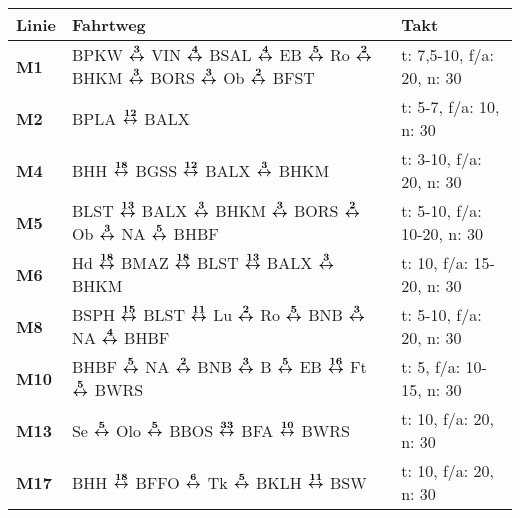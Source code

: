 \begin{minipage}[t]{0.05\textwidth}
\phantom{Tor}
\end{minipage}
\begin{minipage}[t]{0.45\textwidth}
\begin{tabular}{>{\bfseries}L{1.2cm}L{9.0cm}L{3.0cm}}
{\bfseries Linie} & {\bfseries Fahrtweg} & {\bfseries Takt} \\
\hline
\mtram{} M1   & BPKW $\xarwe{3}$ VIN $\xarwe{4}$ BSAL $\xarwe{4}$ EB $\xarwe{5}$ Ro $\xarwe{2}$ BHKM $\xarwe{3}$ BORS $\xarwe{3}$ Ob $\xarwe{2}$ BFST                               & t: 7,5-10, f/a: 20, n: 30  \\
\mtram{} M2   & BPLA $\xarwe{12}$ BALX                                                                                                                                              & t: 5-7, f/a: 10, n: 30     \\
\mtram{} M4   & BHH $\xarwe{18}$ BGSS $\xarwe{12}$ BALX $\xarwe{3}$ BHKM                                                                                                            & t: 3-10, f/a: 20, n: 30    \\
\mtram{} M5   & BLST $\xarwe{13}$ BALX $\xarwe{3}$ BHKM $\xarwe{3}$ BORS $\xarwe{2}$ Ob $\xarwe{3}$ NA $\xarwe{5}$ BHBF                                                             & t: 5-10, f/a: 10-20, n: 30 \\
\mtram{} M6   & Hd $\xarwe{18}$ BMAZ $\xarwe{18}$ BLST $\xarwe{13}$ BALX $\xarwe{3}$ BHKM                                                                                           & t: 10, f/a: 15-20, n: 30   \\
\mtram{} M8   & BSPH $\xarwe{15}$ BLST $\xarwe{11}$ Lu $\xarwe{2}$ Ro $\xarwe{5}$ BNB $\xarwe{3}$ NA $\xarwe{4}$ BHBF                                                               & t: 5-10, f/a: 20, n: 30    \\
\mtram{} M10  & BHBF $\xarwe{5}$ NA $\xarwe{2}$ BNB $\xarwe{3}$ B $\xarwe{5}$ EB $\xarwe{16}$ Ft $\xarwe{5}$ BWRS                                                                   & t: 5, f/a: 10-15, n: 30    \\
\mtram{} M13  & Se $\xarwe{5}$ Olo $\xarwe{5}$ BBOS $\xarwe{33}$ BFA $\xarwe{10}$ BWRS                                                                                              & t: 10, f/a: 20, n: 30      \\
\mtram{} M17  & BHH $\xarwe{18}$ BFFO $\xarwe{6}$ Tk $\xarwe{5}$ BKLH $\xarwe{11}$ BSW                                                                                              & t: 10, f/a: 20, n: 30      \\

\end{tabular}
\end{minipage}
